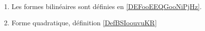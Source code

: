 
    \begin{enumerate}
\item
    Les formes bilinéaires sont définies en \ref{DEFooEEQGooNiPjHz}.
\item
    Forme quadratique, définition \ref{DefBSIoouvuKR}
\end{enumerate}

